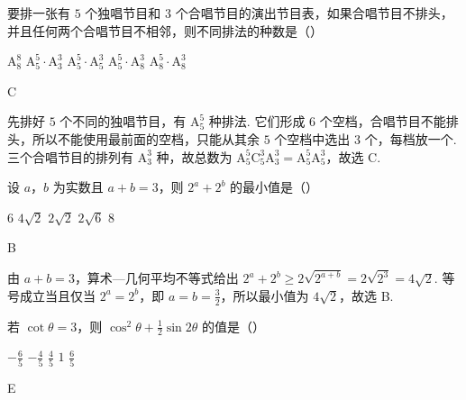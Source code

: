 \begin{problem}

要排一张有 \(5\) 个独唱节目和 \(3\) 个合唱节目的演出节目表，如果合唱节目不排头，并且任何两个合唱节目不相邻，则不同排法的种数是（\quad）

\choicesfive
    {\(\mathrm A_8^8 \)}
    {\(\mathrm A_5^5\cdot \mathrm A_3^3 \)}
    {\(\mathrm A_5^5\cdot \mathrm A_5^3 \)}
    {\(\mathrm A_5^5\cdot \mathrm A_8^3 \)}
    {\(\mathrm A_8^5\cdot \mathrm A_8^3\)}
\end{problem}

\begin{answer}
C
\end{answer}

\begin{solution}
先排好 \(5\) 个不同的独唱节目，有 \(\mathrm A_5^5\) 种排法. 它们形成 \(6\) 个空档，合唱节目不能排头，所以不能使用最前面的空档，只能从其余 \(5\) 个空档中选出 \(3\) 个，每档放一个. 三个合唱节目的排列有 \(\mathrm A_3^3\) 种，故总数为 \(\mathrm A_5^5\mathrm C_5^3\mathrm A_3^3=\mathrm A_5^5\mathrm A_5^3\)，故选 C.
\end{solution}

\begin{problem}

设 \(a\)，\(b\) 为实数且 \(a + b = 3 \)，则 \(2^{a} + 2^{b} \) 的最小值是（\quad）

\choicesfive
    {\(6\)}
    {\(4\sqrt{2} \)}
    {\(2\sqrt{2} \)}
    {\(2\sqrt{6} \)}
    {\(8\)}
\end{problem}

\begin{answer}
B
\end{answer}

\begin{solution}
由 \(a+b=3\)，算术—几何平均不等式给出 \(2^a+2^b\geq2\sqrt{2^{a+b}}=2\sqrt{2^3}=4\sqrt{2}\). 等号成立当且仅当 \(2^a=2^b\)，即 \(a=b=\frac{3}{2}\)，所以最小值为 \(4\sqrt{2}\)，故选 B.
\end{solution}

\begin{problem}

若 \(\cot\theta=3 \)，则 \(\cos^{2}\theta+\frac{1}{2}\sin2\theta \) 的值是（\quad）

\choicesfive
    {\(-\frac{6}{5} \)}
    {\(-\frac{4}{5} \)}
    {\(\frac{4}{5} \)}
    {\(1\)}
    {\(\frac{6}{5} \)}
\end{problem}

\begin{answer}
E
\end{answer}

